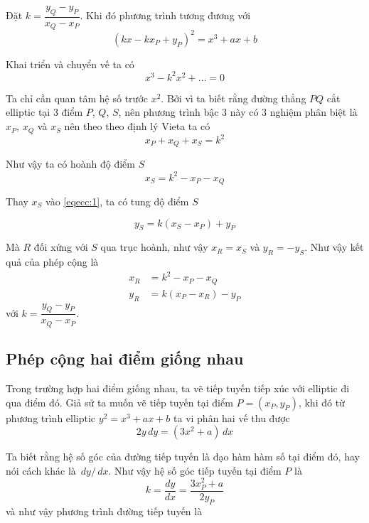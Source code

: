 Đặt $k = \dfrac{y_Q - y_P}{x_Q - x_P}$. Khi đó phương trình tương đương
với 
\[(k x - k x_P + y_P)^2 = x^3 + ax + b\]

Khai triển và chuyển vế ta có
\begin{equation}
    x^3 - k^2 x^2 + \ldots = 0
\end{equation}

Ta chỉ cần quan tâm hệ số trước $x^2$. Bởi vì ta biết rằng đường thẳng $PQ$ 
cắt elliptic tại 3 điểm $P$, $Q$, $S$, nên phương trình bậc 3 này có 3 nghiệm 
phân biệt là $x_P$, $x_Q$ và $x_S$ nên theo theo định lý Vieta ta có
\begin{equation*}
    x_P + x_Q + x_S = k^2
\end{equation*}

Như vậy ta có hoành độ điểm $S$
\begin{equation}
    x_S = k^2 - x_P - x_Q
\end{equation}

Thay $x_S$ vào \ref{eqecc:1}, ta có tung độ điểm $S$

\begin{equation}
    y_S = k(x_S - x_P) + y_P
\end{equation}

Mà $R$ đối xứng với $S$ qua trục hoành, như vậy $x_R = x_S$ và $y_R = -y_S$.
Như vậy kết quả của phép cộng là
\begin{align*}
    x_R & = k^2 - x_P - x_Q \\
    y_R & = k(x_P - x_R) - y_P
\end{align*}
với $k = \dfrac{y_Q - y_P}{x_Q - x_P}$.

\subsection*{Phép cộng hai điểm giống nhau}

Trong trường hợp hai điểm giống nhau, ta vẽ tiếp tuyến tiếp xúc với
elliptic đi qua điểm đó. Giả sử ta muốn vẽ tiếp tuyến tại 
điểm $P = (x_P, y_P)$, khi đó từ phương trình elliptic
$y^2 = x^3 + ax + b$ ta vi phân hai vế thu được
\begin{equation}
    2y \,dy = (3x^2 + a) \,dx
\end{equation}

Ta biết rằng hệ số góc của đường tiếp tuyến là đạo hàm hàm số
tại điểm đó, hay nói cách khác là $\,dy/\,dx$. Như vậy hệ số góc
tiếp tuyến tại điểm $P$ là
\begin{equation}
    k = \frac{dy}{dx} = \frac{3 x_P^2 + a}{2y_P}
\end{equation}
và như vậy phương trình đường tiếp tuyến là

